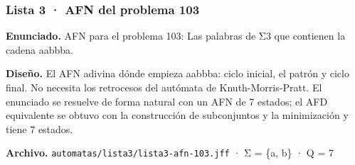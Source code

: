 
\hypertarget{lista-3-afn-del-problema-103}{%
\subsubsection{Lista 3 · AFN del problema 103}\label{lista-3-afn-del-problema-103}}

\textbf{Enunciado.} AFN para el problema 103: Las palabras de Σ3 que contienen la cadena aabbba.

\textbf{Diseño.} El AFN adivina dónde empieza aabbba: ciclo inicial, el patrón y ciclo final. No necesita los retrocesos del autómata de Knuth-Morris-Pratt. El enunciado se resuelve de forma natural con un AFN de 7 estados; el AFD equivalente se obtuvo con la construcción de subconjuntos y la minimización y tiene 7 estados.

\textbf{Archivo.} \texttt{automatas/lista3/lista3-afn-103.jff} · Σ = \{a, b\} · \textbar Q\textbar{} = 7

